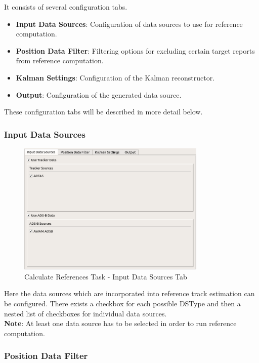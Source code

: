 It consists of several configuration tabs.

\begin{itemize}
    \item \textbf{Input Data Sources}: Configuration of data sources to use for reference computation.
    \item \textbf{Position Data Filter}: Filtering options for excluding certain target reports from reference computation.
    \item \textbf{Kalman Settings}: Configuration of the Kalman reconstructor.
    \item \textbf{Output}: Configuration of the generated data source. \\
\end{itemize}

These configuration tabs will be described in more detail below.

\subsubsection{Input Data Sources}

\begin{figure}[H]
    \center
      \includegraphics[width=9cm]{figures/ui_task_references_tab_inputds.png}
    \caption{Calculate References Task - Input Data Sources Tab}
\end{figure}

Here the data sources which are incorporated into reference track estimation can be configured.
There exists a checkbox for each possible DSType and then a nested list of checkboxes for individual data sources. \\

\textbf{Note}: At least one data source has to be selected in order to run reference computation.

\subsubsection{Position Data Filter}

